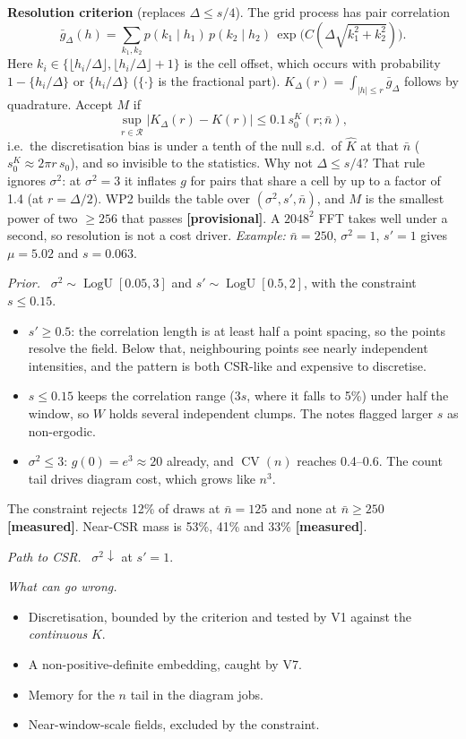 \documentclass[10pt,a4paper]{article}
\newcommand{\measured}{\textcolor{green!45!black}{\textbf{[measured]}}}
\newcommand{\prov}{\textcolor{orange!85!black}{\textbf{[provisional]}}}
\newcommand{\nbar}{\bar n}
\newcommand{\LogU}{\operatorname{LogU}}
\newcommand{\R}{\mathcal{R}}
\newcommand{\sub}[1]{\par\textit{#1}\ }
\begin{document}
\textbf{Resolution criterion} (replaces $\Delta\le s/4$). The grid process has pair correlation
\[
\bar g_\Delta(h)=\sum_{k_1,k_2}p(k_1\mid h_1)\,p(k_2\mid h_2)\,\exp\!\big(C(\Delta\sqrt{k_1^2+k_2^2})\big).
\]
Here $k_i\in\{\lfloor h_i/\Delta\rfloor,\lfloor h_i/\Delta\rfloor+1\}$ is the cell offset, which occurs with probability $1-\{h_i/\Delta\}$ or $\{h_i/\Delta\}$ ($\{\cdot\}$ is the fractional part). $K_\Delta(r)=\int_{|h|\le r}\bar g_\Delta$ follows by quadrature. Accept $M$ if
\[
\sup_{r\in\R}|K_\Delta(r)-K(r)|\le0.1\,s_0^K(r;\nbar),
\]
i.e.\ the discretisation bias is under a tenth of the null s.d.\ of $\hat K$ at that $\nbar$ ($s_0^K\approx2\pi r\,s_0$), and so invisible to the statistics. Why not $\Delta\le s/4$? That rule ignores $\sigma^2$: at $\sigma^2=3$ it inflates $g$ for pairs that share a cell by up to a factor of 1.4 (at $r=\Delta/2$). WP2 builds the table over $(\sigma^2,s',\nbar)$, and $M$ is the smallest power of two $\ge256$ that passes \prov. A $2048^2$ FFT takes well under a second, so resolution is not a cost driver. \emph{Example:} $\nbar=250$, $\sigma^2=1$, $s'=1$ gives $\mu=5.02$ and $s=0.063$.
\sub{Prior.} $\sigma^2\sim\LogU[0.05,3]$ and $s'\sim\LogU[0.5,2]$, with the constraint $s\le0.15$.
\begin{itemize}
  \item $s'\ge0.5$: the correlation length is at least half a point spacing, so the points resolve the field. Below that, neighbouring points see nearly independent intensities, and the pattern is both CSR-like and expensive to discretise.
  \item $s\le0.15$ keeps the correlation range ($3s$, where it falls to 5\%) under half the window, so $W$ holds several independent clumps. The notes flagged larger $s$ as non-ergodic.
  \item $\sigma^2\le3$: $g(0)=e^3\approx20$ already, and $\operatorname{CV}(n)$ reaches 0.4--0.6. The count tail drives diagram cost, which grows like $n^{3}$.
\end{itemize}
The constraint rejects 12\% of draws at $\nbar=125$ and none at $\nbar\ge250$ \measured. Near-CSR mass is 53\%, 41\% and 33\% \measured.
\sub{Path to CSR.} $\sigma^2\downarrow$ at $s'=1$.
\sub{What can go wrong.}
\begin{itemize}
  \item Discretisation, bounded by the criterion and tested by V1 against the \emph{continuous} $K$.
  \item A non-positive-definite embedding, caught by V7.
  \item Memory for the $n$ tail in the diagram jobs.
  \item Near-window-scale fields, excluded by the constraint.
\end{itemize}
\end{document}
